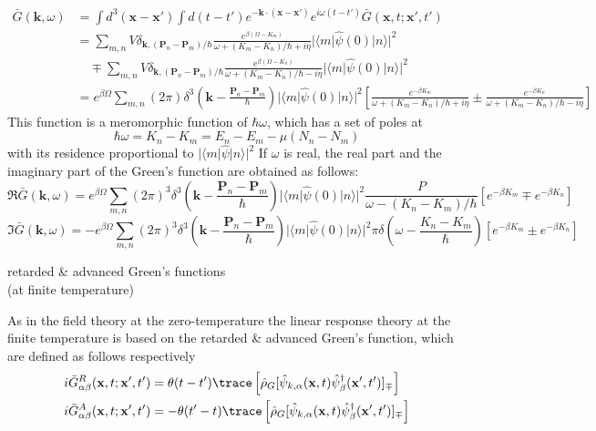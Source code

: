 \begin{equation}
\begin{aligned}
\bar{G} (\mathbf{k},\omega)&=\int d^3(\mathbf{x}-\mathbf{x}') \int d(t-t') e^{-\mathbf{k}\cdot (\mathbf{x}-\mathbf{x}')} e^{i\omega(t-t')} \bar{G} (\mathbf{x},t;\mathbf{x}',t')\\
&=\sum_{m,n} V \delta_{\mathbf{k},(\mathbf{P}_n-\mathbf{P}_m)/\hbar} \frac{e^{\beta(\Omega-K_m)}}{\omega+(K_m-K_n)/\hbar +i\eta} |\langle m|\hat{\psi}(0) |n\rangle |^2\\
&\quad \mp \sum_{m,n} V \delta_{\mathbf{k},(\mathbf{P}_n-\mathbf{P}_m)/\hbar} \frac{e^{\beta(\Omega-K_n)}}{\omega+(K_m-K_n)/\hbar -i\eta} |\langle m|\hat{\psi}(0) |n\rangle |^2\\
&=e^{\beta\Omega} \sum_{m,n} (2\pi) \delta^3 (\mathbf{k}-\frac{\mathbf{P}_n-\mathbf{P}_m}{\hbar})  |\langle m|\hat{\psi}(0) |n\rangle |^2 \left[ \frac{e^{-\beta K_m}}{\omega+(K_m-K_n)/\hbar +i\eta} \pm \frac{e^{-\beta K_n}}{\omega+(K_m-K_n)/\hbar -i\eta} \right]
\end{aligned}
\end{equation}
 This function is a meromorphic function of $\hbar \omega$, which has a set of poles at 
\[
\hbar \omega=K_n-K_m=E_n-E_m-\mu(N_n-N_m)
\]
with its residence proportional to $|\langle m|\hat \psi |n\rangle|^2$
 If $\omega$ is real, the real part and the imaginary part of the Green's function are obtained as follows:
\begin{equation}
\Re\bar G(\mathbf{k},\omega)=e^{\beta\Omega} \sum_{m,n} (2\pi)^3 \delta^3 (\mathbf{k}-\frac{\mathbf{P}_n-\mathbf{P}_m}{\hbar})  |\langle m|\hat{\psi}(0) |n\rangle |^2 \frac{P}{\omega-(K_n-K_m)/\hbar} [e^{-\beta K_m}\mp e^{-\beta K_n}]
\end{equation}
\begin{equation}
\Im\bar G(\mathbf{k},\omega)=-e^{\beta\Omega} \sum_{m,n} (2\pi)^3 \delta^3 (\mathbf{k}-\frac{\mathbf{P}_n-\mathbf{P}_m}{\hbar})  |\langle m|\hat{\psi}(0) |n\rangle |^2 \pi \delta(\omega-\frac{K_n-K_m}{\hbar}) [e^{-\beta K_m}\pm e^{-\beta K_n}]
\end{equation}
\begin{center}
retarded \& advanced Green's functions\\
(at finite temperature)
\end{center}
 As in the field theory at the zero-temperature the linear response theory at the finite temperature is based on the retarded \& advanced Green's function, which are defined as follows respectively
\begin{equation}
\begin{aligned}
i\bar G ^R_{\alpha\beta}(\mathbf{x},t;\mathbf{x}',t')&=\theta(t-t')\trace \left[ \hat\rho_G [\hat \psi_{k,\alpha}(\mathbf{x},t) \hat\psi_\beta^\dag(\mathbf{x}',t')]_\mp \right]\\
i\bar G ^A_{\alpha\beta}(\mathbf{x},t;\mathbf{x}',t')&=-\theta(t'-t)\trace \left[ \hat\rho_G [\hat \psi_{k,\alpha}(\mathbf{x},t) \hat\psi_\beta^\dag(\mathbf{x}',t')]_\mp \right]\\
\end{aligned}
\end{equation}
